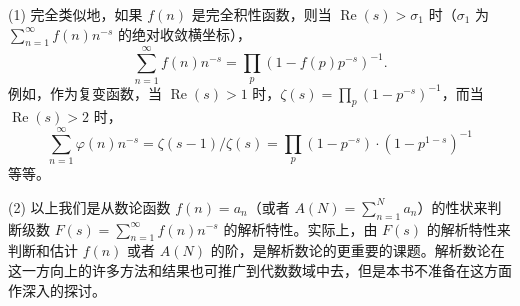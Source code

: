 \begin{remark}
(1) 完全类似地，如果 $f(n)$ 是完全积性函数，则当 $\operatorname{Re}(s)>\sigma_1$ 时（$\sigma_1$ 为 $\sum_{n=1}^{\infty}f(n)n^{-s}$ 的绝对收敛横坐标），
\[
  \sum_{n=1}^{\infty}f(n)n^{-s}=\prod_p(1-f(p)p^{-s})^{-1}.
\]
例如，作为复变函数，当 $\operatorname{Re}(s)>1$ 时，$\zeta(s)=\prod_p(1-p^{-s})^{-1}$，而当 $\operatorname{Re}(s)>2$ 时，
\[
  \sum_{n=1}^{\infty}\varphi(n)n^{-s}=\zeta(s-1)/\zeta(s)=\prod_p(1-p^{-s})\cdot(1-p^{1-s})^{-1}
\]
等等。

\begin{sloppypar}
(2) 以上我们是从数论函数 $f(n)=a_n$（或者 $A(N)=\sum_{n=1}^{N}a_n$）的性状来判断级数 $F(s)=\sum_{n=1}^{\infty}f(n)n^{-s}$ 的解析特性。实际上，由 $F(s)$ 的解析特性来判断和估计 $f(n)$ 或者 $A(N)$ 的阶，是解析数论的更重要的课题。解析数论在这一方向上的许多方法和结果也可推广到代数数域中去，但是本书不准备在这方面作深入的探讨。
\end{sloppypar}
\end{remark}

